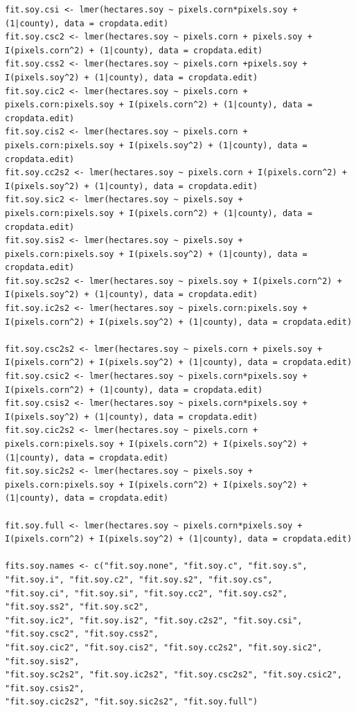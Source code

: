 \documentclass{article}
\begin{document}
\begin{Verbatim}[fontsize=\tiny]
fit.soy.csi <- lmer(hectares.soy ~ pixels.corn*pixels.soy + (1|county), data = cropdata.edit)
fit.soy.csc2 <- lmer(hectares.soy ~ pixels.corn + pixels.soy + I(pixels.corn^2) + (1|county), data = cropdata.edit)
fit.soy.css2 <- lmer(hectares.soy ~ pixels.corn +pixels.soy + I(pixels.soy^2) + (1|county), data = cropdata.edit)
fit.soy.cic2 <- lmer(hectares.soy ~ pixels.corn + pixels.corn:pixels.soy + I(pixels.corn^2) + (1|county), data = cropdata.edit)
fit.soy.cis2 <- lmer(hectares.soy ~ pixels.corn + pixels.corn:pixels.soy + I(pixels.soy^2) + (1|county), data = cropdata.edit)
fit.soy.cc2s2 <- lmer(hectares.soy ~ pixels.corn + I(pixels.corn^2) + I(pixels.soy^2) + (1|county), data = cropdata.edit)
fit.soy.sic2 <- lmer(hectares.soy ~ pixels.soy + pixels.corn:pixels.soy + I(pixels.corn^2) + (1|county), data = cropdata.edit)
fit.soy.sis2 <- lmer(hectares.soy ~ pixels.soy + pixels.corn:pixels.soy + I(pixels.soy^2) + (1|county), data = cropdata.edit)
fit.soy.sc2s2 <- lmer(hectares.soy ~ pixels.soy + I(pixels.corn^2) + I(pixels.soy^2) + (1|county), data = cropdata.edit)
fit.soy.ic2s2 <- lmer(hectares.soy ~ pixels.corn:pixels.soy + I(pixels.corn^2) + I(pixels.soy^2) + (1|county), data = cropdata.edit)

fit.soy.csc2s2 <- lmer(hectares.soy ~ pixels.corn + pixels.soy + I(pixels.corn^2) + I(pixels.soy^2) + (1|county), data = cropdata.edit)
fit.soy.csic2 <- lmer(hectares.soy ~ pixels.corn*pixels.soy + I(pixels.corn^2) + (1|county), data = cropdata.edit)
fit.soy.csis2 <- lmer(hectares.soy ~ pixels.corn*pixels.soy + I(pixels.soy^2) + (1|county), data = cropdata.edit)
fit.soy.cic2s2 <- lmer(hectares.soy ~ pixels.corn + pixels.corn:pixels.soy + I(pixels.corn^2) + I(pixels.soy^2) + (1|county), data = cropdata.edit)
fit.soy.sic2s2 <- lmer(hectares.soy ~ pixels.soy + pixels.corn:pixels.soy + I(pixels.corn^2) + I(pixels.soy^2) + (1|county), data = cropdata.edit)

fit.soy.full <- lmer(hectares.soy ~ pixels.corn*pixels.soy + I(pixels.corn^2) + I(pixels.soy^2) + (1|county), data = cropdata.edit)

fits.soy.names <- c("fit.soy.none", "fit.soy.c", "fit.soy.s", "fit.soy.i", "fit.soy.c2", "fit.soy.s2", "fit.soy.cs",
"fit.soy.ci", "fit.soy.si", "fit.soy.cc2", "fit.soy.cs2", "fit.soy.ss2", "fit.soy.sc2",
"fit.soy.ic2", "fit.soy.is2", "fit.soy.c2s2", "fit.soy.csi", "fit.soy.csc2", "fit.soy.css2",
"fit.soy.cic2", "fit.soy.cis2", "fit.soy.cc2s2", "fit.soy.sic2", "fit.soy.sis2",
"fit.soy.sc2s2", "fit.soy.ic2s2", "fit.soy.csc2s2", "fit.soy.csic2", "fit.soy.csis2",
"fit.soy.cic2s2", "fit.soy.sic2s2", "fit.soy.full")


\end{Verbatim}
\end{document}
